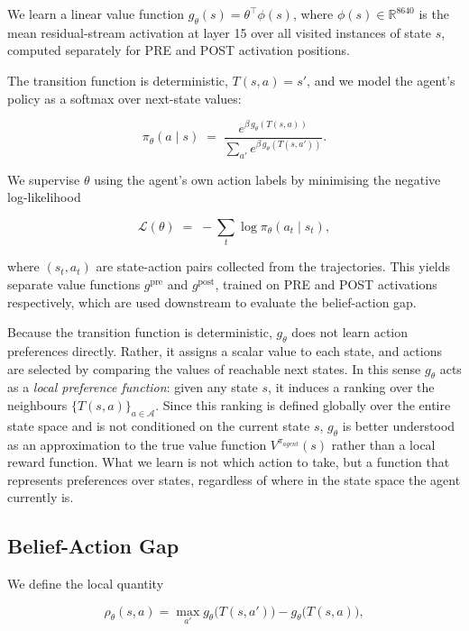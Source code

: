 \documentclass[final]{sparreport}
\begin{document}
We learn a linear value function $g_\theta(s) = \theta^\top \phi(s)$, where $\phi(s) \in \mathbb{R}^{8640}$ is the mean residual-stream activation at layer 15 over all visited instances of state $s$, computed separately for PRE and POST activation positions.

The transition function is deterministic, $T(s, a) = s'$, and we model the agent's policy as a softmax over next-state values:

\begin{equation}
    \pi_\theta(a \mid s)
    \;=\;
    \frac{e^{\beta\, g_\theta(T(s, a))}}
         {\sum_{a'} e^{\beta\, g_\theta(T(s, a'))}}.
\end{equation}

We supervise $\theta$ using the agent's own action labels by minimising the negative log-likelihood

\begin{equation}
    \mathcal{L}(\theta)
    \;=\;
    -\sum_{t} \log \pi_\theta(a_t \mid s_t),
\end{equation}

where $(s_t, a_t)$ are state-action pairs collected from the trajectories.
This yields separate value functions $g^{\text{pre}}$ and $g^{\text{post}}$,
trained on PRE and POST activations respectively, which are used downstream
to evaluate the belief-action gap.

Because the transition function is deterministic, $g_\theta$ does not learn 
action preferences directly. Rather, it assigns a scalar value to each state, 
and actions are selected by comparing the values of reachable next states. 
In this sense $g_\theta$ acts as a \emph{local preference function}: given any 
state $s$, it induces a ranking over the neighbours $\{T(s,a)\}_{a \in \mathcal{A}}$. 
Since this ranking is defined globally over the entire state space and is not 
conditioned on the current state $s$, $g_\theta$ is better understood as an 
approximation to the true value function $V^{\pi_{agent}}(s)$ rather than a local reward function. 
What we learn is not which action to take, but a function that represents preferences 
over states, regardless of where in the state space the agent currently is.


\subsection{Belief-Action Gap}

We define the local quantity

\begin{equation}
    \rho_\theta(s, a) = \max_{a'} g_\theta\bigl(T(s, a')\bigr) - g_\theta\bigl(T(s, a)\bigr),
\end{equation}
\end{document}
